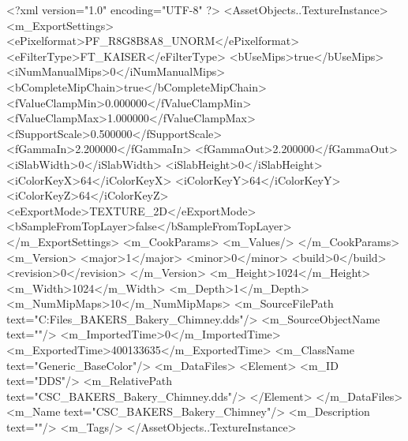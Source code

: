 <?xml version="1.0" encoding="UTF-8" ?>
<AssetObjects..TextureInstance>
	<m_ExportSettings>
		<ePixelformat>PF_R8G8B8A8_UNORM</ePixelformat>
		<eFilterType>FT_KAISER</eFilterType>
		<bUseMips>true</bUseMips>
		<iNumManualMips>0</iNumManualMips>
		<bCompleteMipChain>true</bCompleteMipChain>
		<fValueClampMin>0.000000</fValueClampMin>
		<fValueClampMax>1.000000</fValueClampMax>
		<fSupportScale>0.500000</fSupportScale>
		<fGammaIn>2.200000</fGammaIn>
		<fGammaOut>2.200000</fGammaOut>
		<iSlabWidth>0</iSlabWidth>
		<iSlabHeight>0</iSlabHeight>
		<iColorKeyX>64</iColorKeyX>
		<iColorKeyY>64</iColorKeyY>
		<iColorKeyZ>64</iColorKeyZ>
		<eExportMode>TEXTURE_2D</eExportMode>
		<bSampleFromTopLayer>false</bSampleFromTopLayer>
	</m_ExportSettings>
	<m_CookParams>
		<m_Values/>
	</m_CookParams>
	<m_Version>
		<major>1</major>
		<minor>0</minor>
		<build>0</build>
		<revision>0</revision>
	</m_Version>
	<m_Height>1024</m_Height>
	<m_Width>1024</m_Width>
	<m_Depth>1</m_Depth>
	<m_NumMipMaps>10</m_NumMipMaps>
	<m_SourceFilePath text="C:\Users\Shadow\Desktop\Working Files\Textures\CSC_BAKERS_Bakery_Chimney.dds"/>
	<m_SourceObjectName text=""/>
	<m_ImportedTime>0</m_ImportedTime>
	<m_ExportedTime>400133635</m_ExportedTime>
	<m_ClassName text="Generic_BaseColor"/>
	<m_DataFiles>
		<Element>
			<m_ID text="DDS"/>
			<m_RelativePath text="CSC_BAKERS_Bakery_Chimney.dds"/>
		</Element>
	</m_DataFiles>
	<m_Name text="CSC_BAKERS_Bakery_Chimney"/>
	<m_Description text=""/>
	<m_Tags/>
</AssetObjects..TextureInstance>

